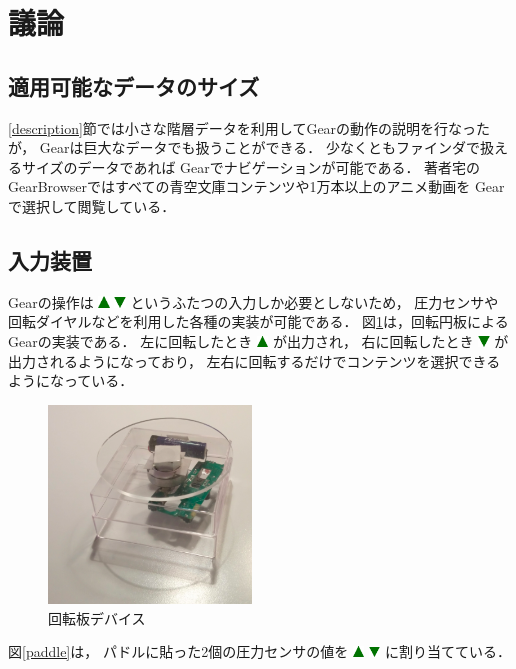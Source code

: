 \documentclass[twoside]{wiss}
\def\GEAR{\textsf{Gear}}
\def\GB{\textsf{GearBrowser}}
\def\up{ \includegraphics[width=3mm,bb=0 0 36 36]{figures/uptriangle.pdf} }
\def\down{ \includegraphics[width=3mm,bb=0 0 36 36]{figures/downtriangle.pdf} }
\begin{document}
\section{議論}

\subsection{適用可能なデータのサイズ}

\ref{description}節では小さな階層データを利用して{\GEAR}の動作の説明を行なったが，
{\GEAR}は巨大なデータでも扱うことができる．
少なくともファインダで扱えるサイズのデータであれば
{\GEAR}でナビゲーションが可能である．
%
著者宅の{\GB}ではすべての青空文庫コンテンツや1万本以上のアニメ動画を
{\GEAR}で選択して閲覧している．


\subsection{入力装置}


{\GEAR}の操作は{\up}{\down}というふたつの入力しか必要としないため，
圧力センサや回転ダイヤルなどを利用した各種の実装が可能である．
%
図\ref{disk}は，回転円板による{\GEAR}の実装である．
左に回転したとき{\up}が出力され，
右に回転したとき{\down}が出力されるようになっており，
左右に回転するだけでコンテンツを選択できるようになっている．

\begin{figure}[H]
\centerline{\includegraphics[width=54mm,bb=0 0 362 354]{figures/ff2d18e66f9a4655dbb5e22e0bb9a0ae.png}}
\caption{回転板デバイス}
\label{disk}
\end{figure}

図\ref{paddle}は，
パドルに貼った2個の圧力センサの値を{\up}{\down}に割り当てている．
\end{document}
